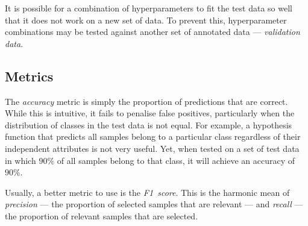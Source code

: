It is possible for a combination of hyperparameters to fit the test data so well that it does not work on a new set of data.
To prevent this, hyperparameter combinations may be tested against another set of annotated data --- \emph{validation data}.

\subsection{Metrics}

The \emph{accuracy} metric is simply the proportion of predictions that are correct.
While this is intuitive, it fails to penalise false positives, particularly when the distribution of classes in the test data is not equal.
For example, a hypothesis function that predicts all samples belong to a particular class regardless of their independent attributes is not very useful.
Yet, when tested on a set of test data in which \( 90\% \) of all samples belong to that class, it will achieve an accuracy of \( 90\% \).

Usually, a better metric to use is the \emph{F1~score}.
This is the harmonic mean of \emph{precision} --- the proportion of selected samples that are relevant --- and \emph{recall} --- the proportion of relevant samples that are selected.
